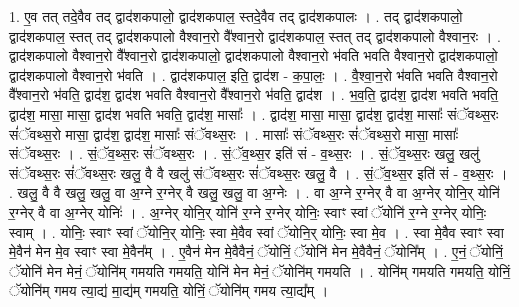 \documentclass[17pt]{extarticle}
\begin{document}
1. ए॒व तत् तदे॒वैव तद् द्वाद॑शकपालो॒ द्वाद॑शकपाल॒ स्तदे॒वैव तद् द्वाद॑शकपालः । . तद् द्वाद॑शकपालो॒ द्वाद॑शकपाल॒ स्तत् तद् द्वाद॑शकपालो वैश्वान॒रो वै᳚श्वान॒रो द्वाद॑शकपाल॒ स्तत् तद् द्वाद॑शकपालो वैश्वान॒रः । . द्वाद॑शकपालो वैश्वान॒रो वै᳚श्वान॒रो द्वाद॑शकपालो॒ द्वाद॑शकपालो वैश्वान॒रो भ॑वति भवति वैश्वान॒रो द्वाद॑शकपालो॒ द्वाद॑शकपालो वैश्वान॒रो भ॑वति । . द्वाद॑शकपाल॒ इति॒ द्वाद॑श - क॒पा॒लः॒ । . वै॒श्वा॒न॒रो भ॑वति भवति वैश्वान॒रो वै᳚श्वान॒रो भ॑वति॒ द्वाद॑श॒ द्वाद॑श भवति वैश्वान॒रो वै᳚श्वान॒रो भ॑वति॒ द्वाद॑श । . भ॒व॒ति॒ द्वाद॑श॒ द्वाद॑श भवति भवति॒ द्वाद॑श॒ मासा॒ मासा॒ द्वाद॑श भवति भवति॒ द्वाद॑श॒ मासाः᳚ । . द्वाद॑श॒ मासा॒ मासा॒ द्वाद॑श॒ द्वाद॑श॒ मासाः᳚ संॅवथ्स॒रः सं॑ॅवथ्स॒रो मासा॒ द्वाद॑श॒ द्वाद॑श॒ मासाः᳚ संॅवथ्स॒रः । . मासाः᳚ संॅवथ्स॒रः सं॑ॅवथ्स॒रो मासा॒ मासाः᳚ संॅवथ्स॒रः । . सं॒ॅव॒थ्स॒रः सं॑ॅवथ्स॒रः । . सं॒ॅव॒थ्स॒र इति॑ सं - व॒थ्स॒रः । . सं॒ॅव॒थ्स॒रः खलु॒ खलु॑ संॅवथ्स॒रः सं॑ॅवथ्स॒रः खलु॒ वै वै खलु॑ संॅवथ्स॒रः सं॑ॅवथ्स॒रः खलु॒ वै । . सं॒ॅव॒थ्स॒र इति॑ सं - व॒थ्स॒रः । . खलु॒ वै वै खलु॒ खलु॒ वा अ॒ग्ने र॒ग्नेर् वै खलु॒ खलु॒ वा अ॒ग्नेः । . वा अ॒ग्ने र॒ग्नेर् वै वा अ॒ग्नेर् योनि॒र् योनि॑ र॒ग्नेर् वै वा अ॒ग्नेर् योनिः॑ । . अ॒ग्नेर् योनि॒र् योनि॑ र॒ग्ने र॒ग्नेर् योनिः॒ स्वाꣳ स्वां ॅयोनि॑ र॒ग्ने र॒ग्नेर् योनिः॒ स्वाम् । . योनिः॒ स्वाꣳ स्वां ॅयोनि॒र् योनिः॒ स्वा मे॒वैव स्वां ॅयोनि॒र् योनिः॒ स्वा मे॒व । . स्वा मे॒वैव स्वाꣳ स्वा मे॒वैन॑ मेन मे॒व स्वाꣳ स्वा मे॒वैन᳚म् । . ए॒वैन॑ मेन मे॒वैवैनं॒ ॅयोनिं॒ ॅयोनि॑ मेन मे॒वैवैनं॒ ॅयोनि᳚म् । . ए॒नं॒ ॅयोनिं॒ ॅयोनि॑ मेन मेनं॒ ॅयोनि॑म् गमयति गमयति॒ योनि॑ मेन मेनं॒ ॅयोनि॑म् गमयति । . योनि॑म् गमयति गमयति॒ योनिं॒ ॅयोनि॑म् गमय त्या॒द्य॑ मा॒द्य॑म् गमयति॒ योनिं॒ ॅयोनि॑म् गमय त्या॒द्य᳚म् । \newline
\end{document}
